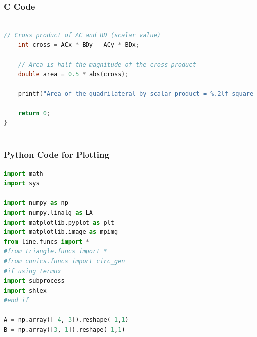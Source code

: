 \documentclass{beamer}
\theoremstyle{remark}
\numberwithin{equation}{section}
\begin{document}
\begin{frame}[fragile]
\frametitle{C Code }
\begin{lstlisting}[language=C]
    
// Cross product of AC and BD (scalar value)
    int cross = ACx * BDy - ACy * BDx;

    // Area is half the magnitude of the cross product
    double area = 0.5 * abs(cross);

    printf("Area of the quadrilateral by scalar product = %.2lf square units\n", area);

    return 0;
}
    
\end{lstlisting}
\end{frame}



\begin{frame}[fragile]
\frametitle{Python Code for Plotting}
\begin{lstlisting}[language=Python]
import math
import sys   

import numpy as np
import numpy.linalg as LA
import matplotlib.pyplot as plt
import matplotlib.image as mpimg
from line.funcs import *
#from triangle.funcs import *
#from conics.funcs import circ_gen
#if using termux
import subprocess
import shlex
#end if

A = np.array([-4,-3]).reshape(-1,1)
B = np.array([3,-1]).reshape(-1,1)


\end{lstlisting}

\end{frame}
\end{document}
